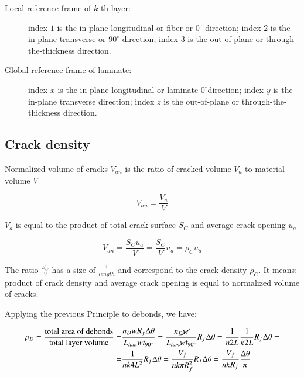 \documentclass[review]{elsarticle}
\begin{document}
\begin{description}
\item[Local reference frame of $k$-th layer: ] index $1$ is the in-plane longitudinal or fiber or $0^{\circ}$-direction; index $2$ is the in-plane transverse or $90^{\circ}$-direction; index $3$ is the out-of-plane or through-the-thickness direction.
\item[Global reference frame of laminate: ] index $x$ is the in-plane longitudinal or laminate $0^{\circ}$direction; index $y$ is the in-plane transverse direction; index $z$ is the out-of-plane or through-the-thickness direction.
\end{description}

\subsection{Crack density}

\begin{prn}
Normalized volume of cracks $V_{an}$ is the ratio of cracked volume $V_{a}$ to material volume $V$

\begin{equation}
V_{an}=\frac{V_{a}}{V}
\end{equation}

$V_{a}$ is equal to the product of total crack surface $S_{C}$ and average crack opening $u_{a}$

\begin{equation}
V_{an}=\frac{S_{C}u_{a}}{V}=\frac{S_{C}}{V}u_{a}=\rho_{C}u_{a}
\end{equation}

The ratio $\frac{S_{C}}{V}$ has a size of $\frac{1}{length}$ and correspond to the crack density $\rho_{C}$. It means: product of crack density and average crack opening is equal to normalized volume of cracks.
\end{prn}

Applying the previous Principle to debonds, we have:

\begin{equation}
\begin{aligned}
\rho_{D}=\frac{\text{total area of debonds}}{\text{total layer volume}}=&\frac{n_{D}wR_{f}\Delta\theta}{L_{lam}wt_{90^{\circ}}}=\frac{n_{D}\cancel{w}}{L_{lam}\cancel{w}t_{90^{\circ}}}R_{f}\Delta\theta=\frac{1}{n2L}\frac{1}{k2L}R_{f}\Delta\theta=\\=&\frac{1}{nk4L^{2}}R_{f}\Delta\theta=\frac{V_{f}}{nk\pi R_{f}^{2}}R_{f}\Delta\theta=\frac{V_{f}}{nkR_{f}}\frac{\Delta\theta}{\pi}
\end{aligned}
\end{equation}
\end{document}
